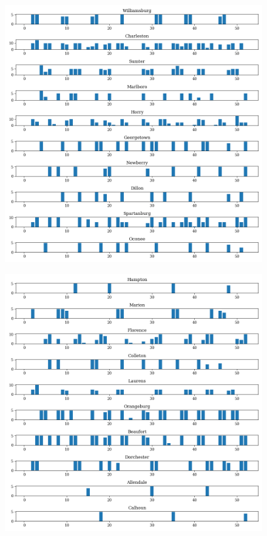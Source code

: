 \documentclass[11pt]{article}
\begin{document}
  \begin{figure}[H]
    \centering
    \includegraphics[width=\textwidth]{../../../output/figures/Exploration/County_weekly_judge_days_1}
  \end{figure}

  \begin{figure}[H]
    \centering
    \includegraphics[width=\textwidth]{../../../output/figures/Exploration/County_weekly_judge_days_2}
  \end{figure}
\end{document}
